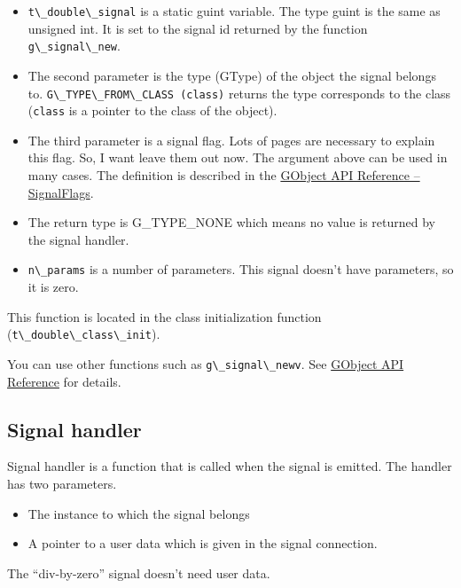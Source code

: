 \begin{itemize}
\tightlist
\item
  \passthrough{\lstinline!t\_double\_signal!} is a static guint
  variable. The type guint is the same as unsigned int. It is set to the
  signal id returned by the function
  \passthrough{\lstinline!g\_signal\_new!}.
\item
  The second parameter is the type (GType) of the object the signal
  belongs to. \passthrough{\lstinline!G\_TYPE\_FROM\_CLASS (class)!}
  returns the type corresponds to the class
  (\passthrough{\lstinline!class!} is a pointer to the class of the
  object).
\item
  The third parameter is a signal flag. Lots of pages are necessary to
  explain this flag. So, I want leave them out now. The argument above
  can be used in many cases. The definition is described in the
  \href{https://docs.gtk.org/gobject/flags.SignalFlags.html}{GObject API
  Reference -- SignalFlags}.
\item
  The return type is G\_TYPE\_NONE which means no value is returned by
  the signal handler.
\item
  \passthrough{\lstinline!n\_params!} is a number of parameters. This
  signal doesn't have parameters, so it is zero.
\end{itemize}

This function is located in the class initialization function
(\passthrough{\lstinline!t\_double\_class\_init!}).

You can use other functions such as
\passthrough{\lstinline!g\_signal\_newv!}. See
\href{https://docs.gtk.org/gobject/func.signal_newv.html}{GObject API
Reference} for details.

\subsection{Signal handler}\label{signal-handler}

Signal handler is a function that is called when the signal is emitted.
The handler has two parameters.

\begin{itemize}
\tightlist
\item
  The instance to which the signal belongs
\item
  A pointer to a user data which is given in the signal connection.
\end{itemize}

The ``div-by-zero'' signal doesn't need user data.

